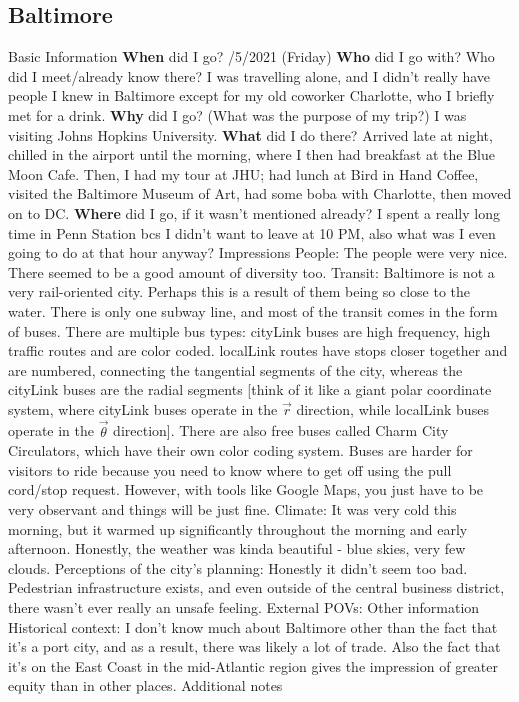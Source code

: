 \documentclass{article}
\begin{document}
    \subsection{Baltimore}
    \begin{outline}
        \1 Basic Information
            \2 \textbf{When} did I go?
                /5/2021 (Friday)
            \2 \textbf{Who} did I go with? Who did I meet/already know there?
                \3 I was travelling alone, and I didn't really have people I knew in Baltimore except for my old coworker Charlotte, who I briefly met for a drink. 
            \2 \textbf{Why} did I go? (What was the purpose of my trip?)
                \3 I was visiting Johns Hopkins University. 
            \2 \textbf{What} did I do there?
                \3 Arrived late at night, chilled in the airport until the morning, where I then had breakfast at the Blue Moon Cafe. Then, I had my tour at JHU; had lunch at Bird in Hand Coffee, visited the Baltimore Museum of Art, had some boba with Charlotte, then moved on to DC. 
            \2 \textbf{Where} did I go, if it wasn't mentioned already?
                \3 I spent a really long time in Penn Station bcs I didn't want to leave at 10 PM, also what was I even going to do at that hour anyway?
        \1 Impressions
            \2 People: The people were very nice. There seemed to be a good amount of diversity too. 
            \2 Transit: Baltimore is not a very rail-oriented city. Perhaps this is a result of them being so close to the water. There is only one subway line, and most of the transit comes in the form of buses. There are multiple bus types: cityLink buses are high frequency, high traffic routes and are color coded. localLink routes have stops closer together and are numbered, connecting the tangential segments of the city, whereas the cityLink buses are the radial segments [think of it like a giant polar coordinate system, where cityLink buses operate in the $\vec r$ direction, while localLink buses operate in the $\vec \theta$ direction]. There are also free buses called Charm City Circulators, which have their own color coding system. Buses are harder for visitors to ride because you need to know where to get off using the pull cord/stop request. However, with tools like Google Maps, you just have to be very observant and things will be just fine. 
            \2 Climate: It was very cold this morning, but it warmed up significantly throughout the morning and early afternoon. Honestly, the weather was kinda beautiful - blue skies, very few clouds. 
            \2 Perceptions of the city's planning: Honestly it didn't seem too bad. Pedestrian infrastructure exists, and even outside of the central business district, there wasn't ever really an unsafe feeling. 
            \2 External POVs:
        \1 Other information 
            \2 Historical context: I don't know much about Baltimore other than the fact that it's a port city, and as a result, there was likely a lot of trade. Also the fact that it's on the East Coast in the mid-Atlantic region gives the impression of greater equity than in other places. 
            \2 Additional notes 
    \end{outline}
\end{document}

